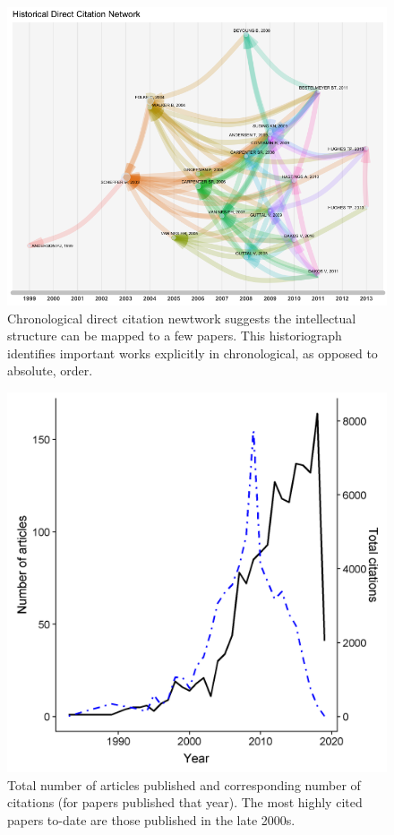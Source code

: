 \documentclass[print]{nuthesis}
\begin{document}
\begin{figure}
\includegraphics[width=0.85\linewidth]{./chapterFiles/rdmReview/figures/figsCalledInDiss/historiograph-75quantile} \caption{Chronological direct citation newtwork suggests the intellectual structure can be mapped to a few papers. This historiograph identifies important works explicitly in chronological, as opposed to absolute, order.}\label{fig:historiograph}
\end{figure}
\begin{figure}
\includegraphics[width=0.85\linewidth]{./chapterFiles/rdmReview/figures/figsCalledInDiss/totArtCitesPerYear} \caption{Total number of articles published and corresponding number of citations (for papers published that year). The most highly cited papers to-date are those published in the late 2000s.}\label{fig:totArtCitesPerYear}
\end{figure}
\end{document}
